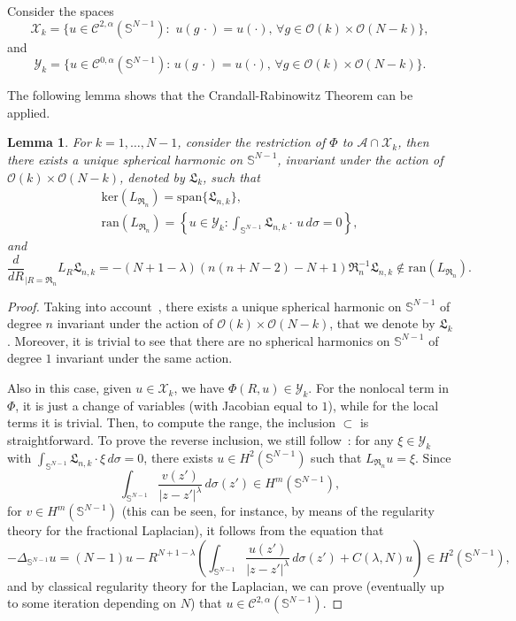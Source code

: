 \documentclass[10pt,reqno,english]{amsart}
\newcommand{\Sn}{\mathbb{S}^{N-1}}
\newcommand{\rn}{{\mathfrak R}_n  }
\newtheorem{lemma}{Lemma}[section]
\theoremstyle{definition}
\numberwithin{equation}{section}
\begin{document}
Consider the spaces
\[
\mathcal X_k=\{u\in\mathcal C^{2,\alpha}(\Sn):\,\,u(g\,\cdot)=u(\cdot),\,\forall g\in\mathcal O(k)\times \mathcal O(N-k)\},
\]
and
\[
\mathcal Y_k=\{u\in\mathcal C^{0,\alpha}(\Sn):\,u(g\,\cdot)=u(\cdot),\,\forall g\in\mathcal O(k)\times \mathcal O(N-k)\}.
\]

The following lemma shows that the Crandall-Rabinowitz Theorem can be applied.

\begin{lemma}
\label{lemma-ker4d}
For $k=1,\dots, N-1$, consider the restriction of $\Phi$ to $\mathcal A\cap\mathcal X_k$, then there exists a unique spherical harmonic on $\Sn$, invariant under the action of $\mathcal O(k)\times \mathcal O(N-k)$, denoted by $\mathfrak L_k$, such that
\begin{gather*}
\mathrm{ker}( L_{\rn})=\mathrm{span}\{\mathfrak L_{n,k}\},\\
\mathrm{ran}(L_{\rn})=\left\{u\in\mathcal Y_k:\int_{\Sn}\mathfrak L_{n,k}\cdot\,u\,d\sigma=0\right\},
\end{gather*}
and
\[
\frac{d}{dR}_{|R=\rn}L_R\mathfrak L_{n,k}= -(N+1-\lambda)(n(n+N-2)-N+1)\rn^{-1}\mathfrak L_{n,k}\not\in\mathrm{ran}(L_{\rn}).
\]
\end{lemma}
\begin{proof}
Taking into account~\cite[Lemma 6.5]{SM90}, there exists a unique spherical harmonic on $\Sn$ of degree $n$ invariant under the action of $\mathcal O(k)\times \mathcal O(N-k)$, that we denote by $\mathfrak L_k$. Moreover, it is trivial to see that there are no spherical harmonics on $\Sn$ of degree $1$ invariant under the same action.

Also in this case, given $u \in \mathcal X_k$, we have $\Phi(R,u) \in \mathcal Y_k$. For the nonlocal term in $\Phi$, it is just a change of variables (with Jacobian equal to $1$), while for the local terms it is trivial.
Then, to compute the range, the inclusion $\subset$ is straightforward. To prove the reverse inclusion, we still follow~\cite{Fr19}: for any $\xi \in\mathcal Y_k$ with $\int_{\Sn}\mathfrak L_{n,k}\cdot\xi\,d\sigma=0$, there exists $u \in H^2(\Sn)$ such that $L_{\rn}u = \xi$. Since
\[
 \int_{\mathbb S^{N-1}} \frac{v (z')}{|z-z'|^\lambda }\,d\sigma(z') \in H^m(\Sn),
\]
for $v \in H^m(\Sn)$ (this can be seen, for instance, by means of the regularity theory for the fractional Laplacian), it follows from the equation that
\[
-\Delta_{\mathbb S^{N-1}} u = (N-1) u - R^{N+1-\lambda} \left( \int_{\mathbb S^{N-1}} \frac{u (z')}{|z-z'|^\lambda }\,d\sigma(z') + C (\lambda, N) u \right) \in H^2(\Sn),
\]
and by classical regularity theory for the Laplacian, we can prove (eventually up to some iteration depending on $N$) that $u \in \mathcal C^{2,\alpha}(\Sn)$.
\end{proof}
\end{document}

